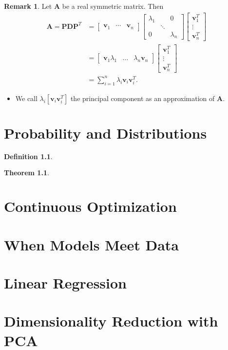 \documentclass[12pt,openany]{book}
\newtheorem{theorem}{Theorem}[chapter]
\theoremstyle{definition}
\newtheorem{definition}{Definition}[chapter]
\newtheorem{remark}{Remark}[chapter]
\renewcommand{\vec}[1]{\textbf{#1}}
\begin{document}
	\begin{remark}
		Let \(\textbf{A}\) be a real symmetric matrix. Then
		\begin{align*}
			\textbf{A}=\textbf{PD}\textbf{P}^T&=\begin{bmatrix}
				\vec{v}_1&\cdots&\vec{v}_n
			\end{bmatrix}\begin{bmatrix}
				\lambda_1 &&0\\ &\ddots&\\0&&\lambda_n
			\end{bmatrix}\begin{bmatrix}
			\vec{v}_1^T\\ \vdots\\\vec{v}_n^T
		\end{bmatrix}\\
		&=\begin{bmatrix}
			\vec{v}_1\lambda_1&\dots&\lambda_n\vec{v}_n
		\end{bmatrix}\begin{bmatrix}
			\vec{v}_1^T\\ \vdots\\\vec{v}_n^T
		\end{bmatrix}\\
		&=\sum_{i=1}^n\lambda_i\vec{v}_i\vec{v}_i^T.
		\end{align*}
		\begin{itemize}
			\item We call \(\lambda_i[\vec{v}_i\vec{v}_i^T]\) the principal component as an approximation of \(\textbf{A}\).
		\end{itemize}
	\end{remark}
	\newpage
	\chapter{Probability and Distributions}
	
	\begin{tcolorbox}[colframe=defcolor,title={\color{white}\bf }]
		\begin{definition}
			
		\end{definition}
	\end{tcolorbox}
	\begin{tcolorbox}[colframe=thmcolor,title={\color{white}\bf }]
		\begin{theorem}
			
		\end{theorem}
	\end{tcolorbox}
	
	\chapter{Continuous Optimization}
	
	\chapter{When Models Meet Data}
	
	\chapter{Linear Regression}
	
	\chapter{Dimensionality Reduction with PCA}
\end{document}
